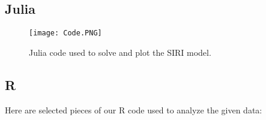 \documentclass[12pt, letterpaper]{article}
\begin{document}
\subsection*{Julia}

 \begin{figure}[h!]
    \centering
    \texttt{[image: Code.PNG]}
    \caption{Julia code used to solve and plot the SIRI model.}
    \label{fig:jcode}
 \end{figure}

\subsection*{R}
Here are selected pieces of our R code used to analyze the given data:


\end{document}
